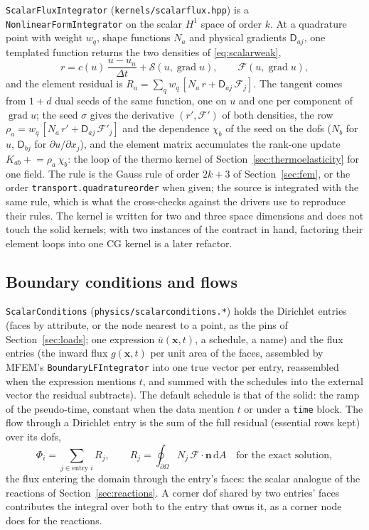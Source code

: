 \documentclass[11pt]{article}
\newcommand{\ud}{\,\mathrm{d}}
\newcommand{\grad}{\operatorname{grad}}
\newcommand{\bx}{\bm{x}}
\newcommand{\bn}{\bm{n}}
\DeclareRobustCommand{\code}[1]{{\def\_{\textunderscore\allowbreak}\texttt{#1}}}
\DeclareRobustCommand{\file}[1]{{\def\_{\textunderscore\allowbreak}\texttt{#1}}}
\begin{document}
\code{ScalarFluxIntegrator} (\file{kernels/scalar\_flux.hpp}) is a
\code{NonlinearFormIntegrator} on the scalar $H^1$ space of order $k$.  At a
quadrature point with weight $w_q$, shape functions $N_a$ and physical
gradients $\mathsf D_{aj}$, one templated function returns the two
densities of \eqref{eq:scalarweak},
\begin{equation}
  r = c(u)\,\frac{u - u_n}{\Delta t} + \mathcal S(u, \grad u),
  \qquad
  \bm{\mathcal F}(u, \grad u),
\end{equation}
and the element residual is $R_a = \sum_q w_q\,[N_a\,r + \mathsf D_{aj}\,\mathcal F_j]$.
The tangent comes from $1 + d$ dual seeds of the same function, one on $u$
and one per component of $\grad u$; the seed $\sigma$ gives the derivative
$(r', \bm{\mathcal F}')$ of both densities, the row
$\rho_a = w_q\,[N_a\,r' + \mathsf D_{aj}\,\mathcal F'_j]$ and the
dependence $\chi_b$ of the seed on the dofs ($N_b$ for $u$, $\mathsf D_{bj}$
for $\partial u/\partial x_j$), and the element matrix accumulates the
rank-one update $K_{ab} \mathrel{+}= \rho_a\,\chi_b$: the loop of the thermo
kernel of Section~\ref{sec:thermoelasticity} for one field.  The rule is
the Gauss rule of order $2k + 3$ of Section~\ref{sec:fem}, or the order
\code{transport.quadrature\_order} when given; the source is integrated
with the same rule, which is what the cross-checks against the drivers use
to reproduce their rules.  The kernel is written for two and three space
dimensions and does not touch the solid kernels; with two instances of the
contract in hand, factoring their element loops into one CG kernel is a
later refactor.

\subsection{Boundary conditions and flows}

\code{ScalarConditions} (\file{physics/scalar\_conditions.*}) holds the
Dirichlet entries (faces by attribute, or the node nearest to a point, as
the pins of Section~\ref{sec:loads}; one expression $\bar u(\bx, t)$, a
schedule, a name) and the flux entries (the inward flux $g(\bx, t)$ per unit
area of the faces, assembled by MFEM's \code{BoundaryLFIntegrator} into one
true vector per entry, reassembled when the expression mentions $t$, and
summed with the schedules into the external vector the residual subtracts).
The default schedule is that of the solid: the ramp of the pseudo-time,
constant when the data mention $t$ or under a \code{time} block.  The flow
through a Dirichlet entry is the sum of the full residual (essential rows
kept) over its dofs,
\begin{equation}
  \Phi_i = \sum_{j \in \text{entry } i} R_j,
  \qquad
  R_j = \oint_{\partial\Omega} N_j\,\bm{\mathcal F}\cdot\bn\ud A
  \quad\text{for the exact solution},
\end{equation}
the flux entering the domain through the entry's faces: the scalar
analogue of the reactions of Section~\ref{sec:reactions}.  A corner dof
shared by two entries' faces contributes the integral over both to the entry
that owns it, as a corner node does for the reactions.
\end{document}
